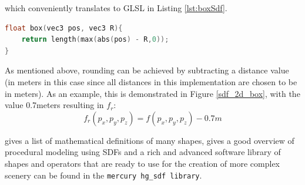 \documentclass[twoside,a4paper]{article}
\begin{document}
which conveniently translates to GLSL in Listing \ref{lst:boxSdf}.

\begin{lstlisting}[language=C, caption={\it GLSL code for creating a box SDF},captionpos=b, label=lst:boxSdf]
float box(vec3 pos, vec3 R){
    return length(max(abs(pos) - R,0));
}
\end{lstlisting}
As mentioned above, rounding can be achieved by subtracting a distance value (in meters in this case since all distances in this implementation are chosen to be in meters). As an example, this is demonstrated in Figure \ref{sdf_2d_box}, with the value 0.7meters resulting in $f_r$:
\begin{equation}
f_r(p_x, p_y, p_z) = f(p_x, p_y, p_z)-0.7m
\end{equation}

\cite{hart_sphere_1996} gives a list of mathematical definitions of many shapes, \cite{diener_procedural_2012} gives a good overview of procedural modeling using SDFs and a rich and advanced  software library of shapes and operators that are ready to use for the creation of more complex scenery can be found in the \texttt{mercury hg\_sdf library}\cite{mercury}.
\end{document}
